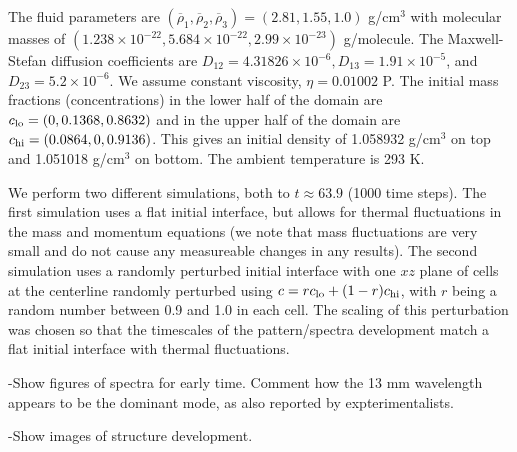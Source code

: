 \documentclass[final]{siamltex}
\begin{document}
The fluid parameters are $(\overline\rho_1, \overline\rho_2, \overline\rho_3) = (2.81, 1.55, 1.0)$ g/cm$^3$
with molecular masses of $(1.238\times 10^{-22}, 5.684\times 10^{-22}, 2.99\times 10^{-23})$ g/molecule.
The Maxwell-Stefan diffusion coefficients are
$D_{12} = 4.31826\times 10^{-6}, D_{13} = 1.91\times 10^{-5}$, and $D_{23} = 5.2\times 10^{-6}$.
We assume constant viscosity, $\eta = 0.01002$ P.  The initial mass fractions (concentrations) in the 
lower half of the domain are $c_{\rm lo} = (0, 0.1368, 0.8632)$ and in the upper half of the domain
are $c_{\rm hi} = (0.0864, 0, 0.9136)$.  This gives an initial density of 1.058932 g/cm$^3$ on top 
and 1.051018 g/cm$^3$ on bottom.  The ambient temperature is 293 K.

We perform two different simulations, both to $t\approx 63.9$ (1000 time steps).
The first simulation uses a flat initial interface, but allows for thermal fluctuations in the mass
and momentum equations (we note that mass fluctuations are very small and do not cause any measureable
changes in any results).  The second simulation uses a randomly perturbed initial interface with one $xz$ plane 
of cells at the centerline randomly perturbed using $c = r c_{\rm lo} + (1-r) c_{\rm hi}$, with $r$ being a 
random number between 0.9 and 1.0 in each cell.  The scaling of this perturbation was chosen
so that the timescales of the pattern/spectra development match a flat initial interface with thermal fluctuations.

-Show figures of spectra for early time.  Comment how the 13 mm wavelength appears to be the dominant mode,
 as also reported by expterimentalists.

-Show images of structure development.
\end{document}
